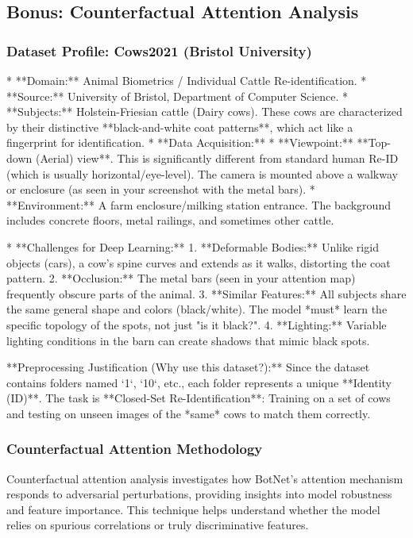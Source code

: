 \documentclass[a4paper,12pt]{article}
\begin{document}
\subsection{Bonus: Counterfactual Attention Analysis}

\subsubsection*{Dataset Profile: Cows2021 (Bristol University)}

* **Domain:** Animal Biometrics / Individual Cattle Re-identification.
* **Source:** University of Bristol, Department of Computer Science.
* **Subjects:** Holstein-Friesian cattle (Dairy cows). These cows are characterized by their distinctive **black-and-white coat patterns**, which act like a fingerprint for identification.
* **Data Acquisition:**
* **Viewpoint:** **Top-down (Aerial) view**. This is significantly different from standard human Re-ID (which is usually horizontal/eye-level). The camera is mounted above a walkway or enclosure (as seen in your screenshot with the metal bars).
* **Environment:** A farm enclosure/milking station entrance. The background includes concrete floors, metal railings, and sometimes other cattle.

* **Challenges for Deep Learning:**
1. **Deformable Bodies:** Unlike rigid objects (cars), a cow's spine curves and extends as it walks, distorting the coat pattern.
2. **Occlusion:** The metal bars (seen in your attention map) frequently obscure parts of the animal.
3. **Similar Features:** All subjects share the same general shape and colors (black/white). The model *must* learn the specific topology of the spots, not just "is it black?".
4. **Lighting:** Variable lighting conditions in the barn can create shadows that mimic black spots.

**Preprocessing Justification (Why use this dataset?):**
Since the dataset contains folders named `1`, `10`, etc., each folder represents a unique **Identity (ID)**. The task is **Closed-Set Re-Identification**: Training on a set of cows and testing on unseen images of the *same* cows to match them correctly.

\subsubsection*{Counterfactual Attention Methodology}
Counterfactual attention analysis investigates how BotNet's attention mechanism responds to adversarial perturbations, providing insights into model robustness and feature importance. This technique helps understand whether the model relies on spurious correlations or truly discriminative features.
\end{document}
